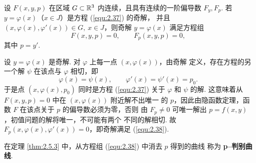 \begin{thm}\label{thm:2.5.3}
设 $F(x,y,p)$ 在区域 $G\subset\mathbb{R}^3$ 内连续，且具有连续的一阶偏导数
$F_y,F_p$. 若 $y=\varphi(x)$（$x\in J$）是方程 (\ref{equ:2.37}) 的奇解，
并且 $(x,\varphi(x),\varphi'(x))\in G,\ x\in J$，则奇解 $y=\varphi(x)$
满足方程组
\begin{equation}\label{equ:2.38}
F(x,y,p)=0,\qquad F_p(x,y,p)=0,
\end{equation}
其中 $p=y'$.
\end{thm}
\begin{pf1}
设 $y=\varphi(x)$ 是奇解. 对 $\varphi$ 上每一点 $(x,\varphi(x))$，由奇解
定义，存在方程的另一个解 $\psi$ 在该点与 $\varphi$ 相切，即
\[
\varphi(x)=\psi(x),\qquad \varphi'(x)=\psi'(x)=p_0.
\]
于是点 $(x,\varphi(x),p_0)$ 同时是方程 (\ref{equ:2.37}) 关于 $\varphi$ 和
$\psi$ 的解. 这意味着从 $F(x,y,p)=0$ 中在 $(x,\varphi(x))$ 附近解不出唯一
的 $p$，因此由隐函数定理，函数 $F$ 在该点关于 $p$ 的偏导数必须为零，否则
由 $F_p\neq0$ 可唯一解出 $p=f(x,y)$，初值问题的解将唯一，不可能有两个
不同的解相切. 故 $F_p(x,\varphi(x),\varphi'(x))=0$，即奇解满足 (\ref{equ:2.38}).
\end{pf1}
\begin{rmk}
在定理 \ref{thm:2.5.3} 中，从方程组 (\ref{equ:2.38}) 中消去 $p$ 得到的曲线
称为 \textbf{p--判别曲线}.
\end{rmk}


